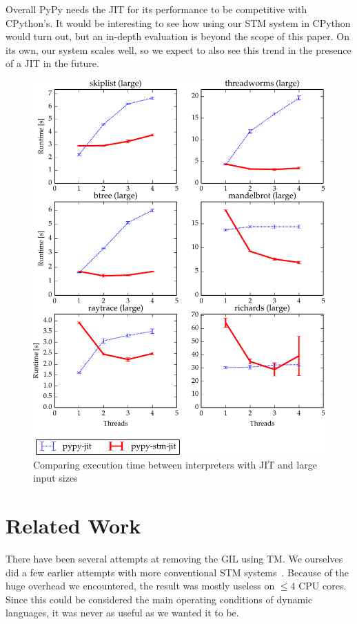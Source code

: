 \documentclass{sigplanconf}
\begin{document}
Overall PyPy needs the JIT  for its performance to be
competitive with CPython's. It would be interesting to see how using
our STM system in CPython would turn out, but an in-depth evaluation is
beyond the scope of this paper. On its own, our system scales well,
so we expect to also see this trend in the presence of a
JIT in the future.


\begin{figure}[h]
  \centering
  \includegraphics[width=1\columnwidth]{plots/performance.pdf}
  \caption{Comparing execution time between interpreters with JIT
    and large input sizes\label{fig:performance-jit}}
\end{figure}



\section{Related Work}

There have been several attempts at removing the GIL using TM. We
ourselves did a few earlier attempts with more conventional STM
systems~\cite{stmupdate13}. Because of the huge overhead we
encountered, the result was mostly useless on $\le 4$ CPU cores.
Since this could be considered the main operating conditions of
dynamic languages, it was never as useful as we wanted it to be.
\end{document}
